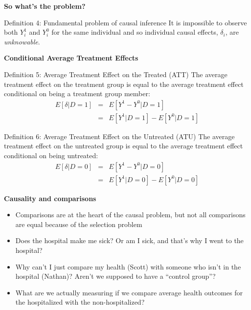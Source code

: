 \documentclass[notes=show]{beamer}
\begin{document}
\begin{frame}[plain]
\begin{center}
\textbf{So what's the problem?}
\end{center}

	\begin{block}{Definition 4: Fundamental problem of causal inference}	
	It is impossible to observe both $Y_i^1$ and $Y_i^0$ for the same individual and so individual causal effects, $\delta_i$, are \emph{unknowable}.
	\end{block}

\end{frame}


\begin{frame}[plain]
	\begin{center}
	\textbf{Conditional Average Treatment Effects}
	\end{center}

	
	\begin{block}{Definition 5: Average Treatment Effect on the Treated (ATT)}
	The average treatment effect on the treatment group is equal to the average treatment effect conditional on being a treatment group member:
		\begin{eqnarray*}
		E[\delta|D=1]&=&E[Y^1-Y^0|D=1] \nonumber \\
		&=&E[Y^1|D=1]-E[Y^0|D=1]
		\end{eqnarray*}
	\end{block}

	\begin{block}{Definition 6: Average Treatment Effect on the Untreated (ATU)}
	The average treatment effect on the untreated group is equal to the average treatment effect conditional on being untreated:
		\begin{eqnarray*}
		E[\delta|D=0]&=&E[Y^1-Y^0|D=0] \nonumber \\
		&=&E[Y^1|D=0]-E[Y^0|D=0]
		\end{eqnarray*}
	\end{block}

\end{frame}


\begin{frame}[plain]
\begin{center}
	\textbf{Causality and comparisons}
\end{center}

	\begin{itemize}
	\item Comparisons are at the heart of the causal problem, but not all comparisons are equal because of the selection problem
	\item Does the hospital make me sick?  Or am I sick, and that's why I went to the hospital?
	\item Why can't I just compare my health (Scott) with someone who isn't in the hospital (Nathan)? Aren't we supposed to have a ``control group''?
	\item What are we actually measuring if we compare average health outcomes for the hospitalized with the non-hospitalized?
	\end{itemize}
\end{frame}	
\end{document}
